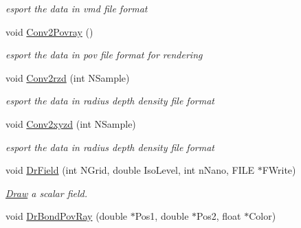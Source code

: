 \begin{DoxyCompactItemize}
\begin{DoxyCompactList}\small\item\em esport the data in vmd file format \end{DoxyCompactList}\item 
void \hyperlink{classElPoly_ac2e836951a966bd69b21705cad363b95}{Conv2\+Povray} ()\hypertarget{classElPoly_ac2e836951a966bd69b21705cad363b95}{}\label{classElPoly_ac2e836951a966bd69b21705cad363b95}

\begin{DoxyCompactList}\small\item\em esport the data in pov file format for rendering \end{DoxyCompactList}\item 
void \hyperlink{classElPoly_a538747fd3f643c9d171a00a5ec371ccc}{Conv2rzd} (int N\+Sample)\hypertarget{classElPoly_a538747fd3f643c9d171a00a5ec371ccc}{}\label{classElPoly_a538747fd3f643c9d171a00a5ec371ccc}

\begin{DoxyCompactList}\small\item\em esport the data in radius depth density file format \end{DoxyCompactList}\item 
void \hyperlink{classElPoly_ad9aa947dfbb4fd8d4f2eb314efc17730}{Conv2xyzd} (int N\+Sample)\hypertarget{classElPoly_ad9aa947dfbb4fd8d4f2eb314efc17730}{}\label{classElPoly_ad9aa947dfbb4fd8d4f2eb314efc17730}

\begin{DoxyCompactList}\small\item\em esport the data in radius depth density file format \end{DoxyCompactList}\item 
void \hyperlink{classElPoly_aee301bfab80a5bff74d1929e63cdbf0f}{Dr\+Field} (int N\+Grid, double Iso\+Level, int n\+Nano, F\+I\+LE $\ast$F\+Write)\hypertarget{classElPoly_aee301bfab80a5bff74d1929e63cdbf0f}{}\label{classElPoly_aee301bfab80a5bff74d1929e63cdbf0f}

\begin{DoxyCompactList}\small\item\em \hyperlink{classDraw}{Draw} a scalar field. \end{DoxyCompactList}\item 
void \hyperlink{classElPoly_a1d6d8bfcdb851627bb183cb803353270}{Dr\+Bond\+Pov\+Ray} (double $\ast$Pos1, double $\ast$Pos2, float $\ast$Color)\hypertarget{classElPoly_a1d6d8bfcdb851627bb183cb803353270}{}\label{classElPoly_a1d6d8bfcdb851627bb183cb803353270}


\end{DoxyCompactItemize}
